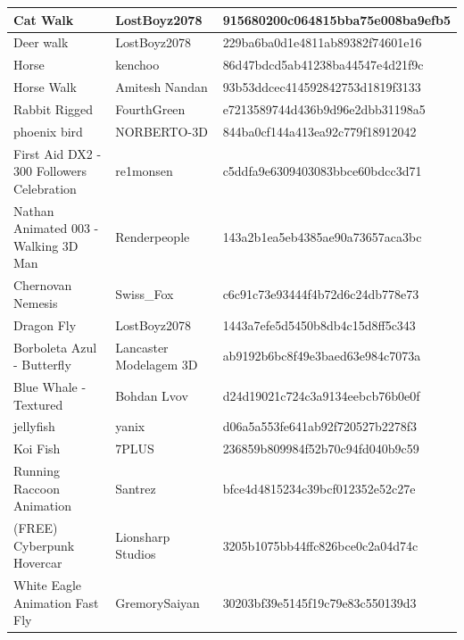 \begin{longtable}{|p{6cm}|p{4cm}|p{6cm}|}
\hline
Cat Walk & LostBoyz2078 & 915680200c064815bba75e008ba9efb5 \\
\hline
Deer walk & LostBoyz2078 & 229ba6ba0d1e4811ab89382f74601e16 \\
\hline
Horse & kenchoo & 86d47bdcd5ab41238ba44547e4d21f9c \\
\hline
Horse Walk & Amitesh Nandan & 93b53ddcec414592842753d1819f3133 \\
\hline
Rabbit Rigged & FourthGreen & e7213589744d436b9d96e2dbb31198a5 \\
\hline
phoenix bird & NORBERTO-3D & 844ba0cf144a413ea92c779f18912042 \\
\hline
First Aid DX2 - 300 Followers Celebration & re1monsen & c5ddfa9e6309403083bbce60bdcc3d71 \\
\hline
Nathan Animated 003 - Walking 3D Man & Renderpeople & 143a2b1ea5eb4385ae90a73657aca3bc \\
\hline
Chernovan Nemesis & Swiss\_Fox & c6c91c73e93444f4b72d6c24db778e73 \\
\hline
Dragon Fly & LostBoyz2078 & 1443a7efe5d5450b8db4c15d8ff5c343 \\
\hline
Borboleta Azul - Butterfly & Lancaster Modelagem 3D & ab9192b6bc8f49e3baed63e984c7073a \\
\hline
Blue Whale - Textured & Bohdan Lvov & d24d19021c724c3a9134eebcb76b0e0f \\
\hline
jellyfish & yanix & d06a5a553fe641ab92f720527b2278f3 \\
\hline
Koi Fish & 7PLUS & 236859b809984f52b70c94fd040b9c59 \\
\hline
Running Raccoon Animation & Santrez & bfce4d4815234c39bcf012352e52c27e \\
\hline
(FREE) Cyberpunk Hovercar & Lionsharp Studios & 3205b1075bb44ffc826bce0c2a04d74c \\
\hline
White Eagle Animation Fast Fly & GremorySaiyan & 30203bf39e5145f19c79e83c550139d3 \\
\hline
\end{longtable}
